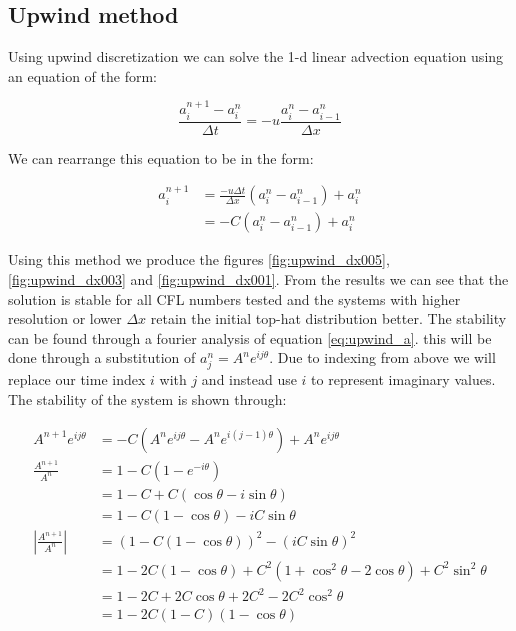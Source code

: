 \subsection*{Upwind method}
\label{sec:Q5a}

Using upwind discretization we can solve the 1-d linear advection equation using an equation of the form:

\begin{equation}
    \frac{a_i^{n+1} - a_i^n}{\Delta t} = -u \frac{a_i^{n} - a_{i-1}^n}{\Delta x}
\label{eq:upwind}
\end{equation}

We can rearrange this equation to be in the form:

\begin{equation}
\begin{split}
    a_i^{n+1} & = \frac{-u \Delta t}{\Delta x} (a_i^{n} - a_{i-1}^n) + a_i^n \\
              & = - C (a_i^{n} - a_{i-1}^n) + a_i^n
\end{split}
\label{eq:upwind_a}
\end{equation}

Using this method we produce the figures \ref{fig:upwind_dx005}, \ref{fig:upwind_dx003} and \ref{fig:upwind_dx001}. From the results we can see that the solution is stable for all CFL numbers tested and the systems with higher resolution or lower $\Delta x$ retain the initial top-hat distribution better. The stability can be found through a fourier analysis of equation \ref{eq:upwind_a}. this will be done through a substitution of $a_j^n = A^n e^{ij \theta}$. Due to indexing from above we will replace our time index $i$ with $j$ and instead use $i$ to represent imaginary values.  The stability of the system is shown through:

\begin{equation}
\begin{split}
    A^{n+1} e^{ij\theta} &= -C (A^{n}e^{ij\theta} - A^n e^{i(j-1)\theta}) + A^n e^{ij\theta} \\
    \frac{A^{n+1}}{A^n} &= 1 - C(1 - e^{-i\theta}) \\
                        &= 1 - C + C(\cos\theta - i\sin\theta) \\
                        &= 1 - C(1 - \cos\theta) - iC\sin\theta \\
    \left|\frac{A^{n+1}}{A^n} \right| &= (1 - C(1 - \cos\theta))^2 - (iC\sin\theta)^2 \\
                        &= 1 - 2C(1-\cos\theta) + C^2(1 + \cos^2\theta - 2\cos\theta) + C^2\sin^2\theta \\
                        &= 1 - 2C + 2C\cos\theta + 2C^2 - 2C^2\cos^2\theta \\
                        &= 1 - 2C(1-C)(1-\cos\theta)
\end{split}
\end{equation}

